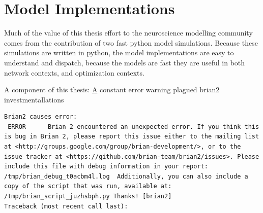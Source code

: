 
    

 \section{Model Implementations}   
 
 Much of the value of this thesis effort to the neuroscience modelling community comes from the contribution of two fast python model simulations. Because these simulations are written in python, the model implementations are easy to understand and dispatch, because the models are fast they are useful in both network contexts, and optimization contexts.
 
A component of this thesis:
\href{https://github.com/russelljjarvis/IzhikevichModel}



A constant error warning plagued brian2 investmentallations
\begin{verbatim}
Brian2 causes error:
 ERROR      Brian 2 encountered an unexpected error. If you think this is bug in Brian 2, please report this issue either to the mailing list at <http://groups.google.com/group/brian-development/>, or to the issue tracker at <https://github.com/brian-team/brian2/issues>. Please include this file with debug information in your report: /tmp/brian_debug_t0acbm4l.log  Additionally, you can also include a copy of the script that was run, available at: /tmp/brian_script_juzhsbph.py Thanks! [brian2]
Traceback (most recent call last):
\end{verbatim}

